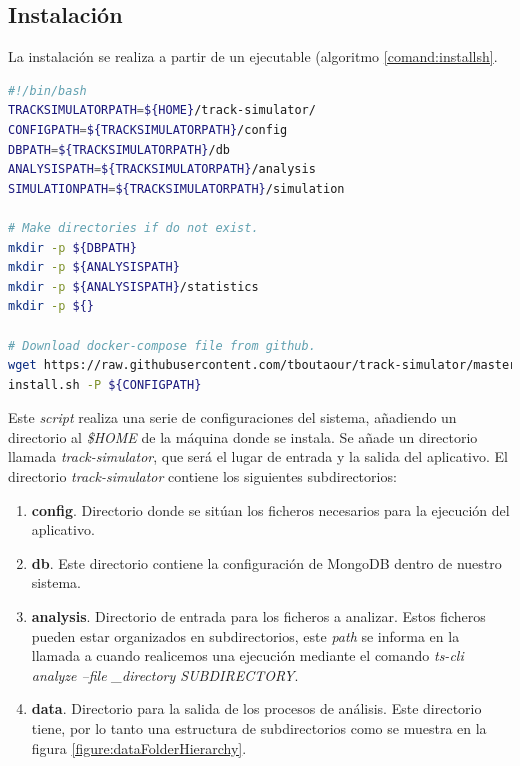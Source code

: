 \subsection{Instalación}
La instalación se realiza a partir de un ejecutable (algoritmo \ref{comand:installsh}. 
\begin{lstlisting}[caption={\textit{Script} instalador de \textit{track-simulator}}, 
language=bash, 
label={comand:installsh}] 
#!/bin/bash
TRACKSIMULATORPATH=${HOME}/track-simulator/
CONFIGPATH=${TRACKSIMULATORPATH}/config
DBPATH=${TRACKSIMULATORPATH}/db
ANALYSISPATH=${TRACKSIMULATORPATH}/analysis
SIMULATIONPATH=${TRACKSIMULATORPATH}/simulation

# Make directories if do not exist.
mkdir -p ${DBPATH}
mkdir -p ${ANALYSISPATH}
mkdir -p ${ANALYSISPATH}/statistics
mkdir -p ${}

# Download docker-compose file from github.
wget https://raw.githubusercontent.com/tboutaour/track-simulator/master/bin/
install.sh -P ${CONFIGPATH}
\end{lstlisting}
Este \textit{script} realiza una serie de configuraciones del sistema, añadiendo un 
directorio al \textit{\$HOME} de la máquina donde se instala. Se añade un directorio 
llamada \textit{track-simulator}, que será el lugar de entrada y la salida del aplicativo. El 
directorio  \textit{track-simulator} contiene los siguientes subdirectorios:
\begin{enumerate}[label={D.\arabic*.}]
\item \textbf{config}. Directorio donde se sitúan los ficheros necesarios para la 
ejecución del aplicativo.
\item \textbf{db}. Este directorio contiene la configuración de MongoDB dentro de 
nuestro sistema.
\item \textbf{analysis}. Directorio de entrada para los ficheros a analizar. Estos ficheros 
pueden estar organizados en subdirectorios, este \textit{path} se informa en la llamada 
a cuando realicemos una ejecución mediante el comando \textit{ts-cli analyze 	--file
\_directory \lbrack SUBDIRECTORY\rbrack}.
\item \textbf{data}. Directorio para la salida de los procesos de análisis. Este directorio 
tiene, por lo tanto una estructura de subdirectorios como se muestra en la figura 
\ref{figure:dataFolderHierarchy}.

\end{enumerate}
